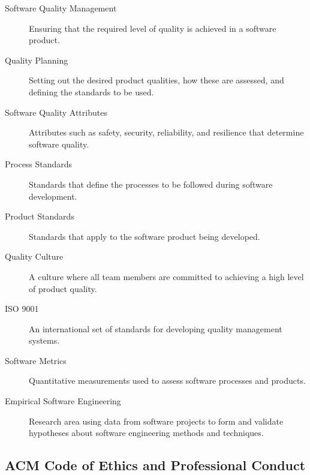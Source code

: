 \documentclass{article}
\begin{document}
\begin{description}
  \item[Software Quality Management] Ensuring that the required level of quality is achieved in a software product.
  \item[Quality Planning] Setting out the desired product qualities, how these are assessed, and defining the standards to be used.
  \item[Software Quality Attributes] Attributes such as safety, security, reliability, and resilience that determine software quality.
  \item[Process Standards] Standards that define the processes to be followed during software development.
  \item[Product Standards] Standards that apply to the software product being developed.
  \item[Quality Culture] A culture where all team members are committed to achieving a high level of product quality.
  \item[ISO 9001] An international set of standards for developing quality management systems.
  \item[Software Metrics] Quantitative measurements used to assess software processes and products.
  \item[Empirical Software Engineering] Research area using data from software projects to form and validate hypotheses about software engineering methods and techniques.
\end{description}

\subsection{ACM Code of Ethics and Professional Conduct}
\end{document}
